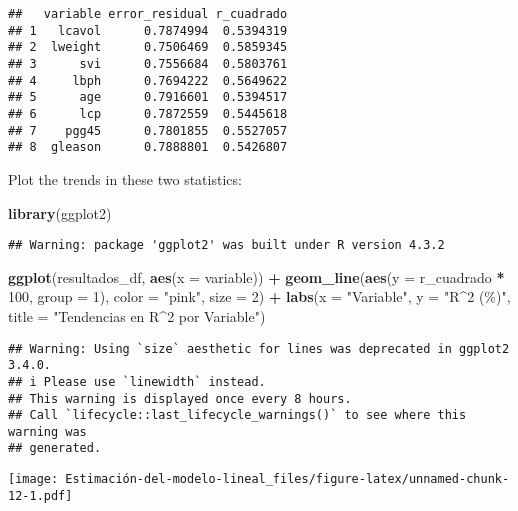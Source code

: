 \documentclass[
]{article}
\newenvironment{Shaded}{\begin{snugshade}}{\end{snugshade}}
\newcommand{\AttributeTok}[1]{\textcolor[rgb]{0.13,0.29,0.53}{#1}}
\newcommand{\DecValTok}[1]{\textcolor[rgb]{0.00,0.00,0.81}{#1}}
\newcommand{\FunctionTok}[1]{\textcolor[rgb]{0.13,0.29,0.53}{\textbf{#1}}}
\newcommand{\NormalTok}[1]{#1}
\newcommand{\SpecialCharTok}[1]{\textcolor[rgb]{0.81,0.36,0.00}{\textbf{#1}}}
\newcommand{\StringTok}[1]{\textcolor[rgb]{0.31,0.60,0.02}{#1}}
\begin{document}
\begin{verbatim}
##   variable error_residual r_cuadrado
## 1   lcavol      0.7874994  0.5394319
## 2  lweight      0.7506469  0.5859345
## 3      svi      0.7556684  0.5803761
## 4     lbph      0.7694222  0.5649622
## 5      age      0.7916601  0.5394517
## 6      lcp      0.7872559  0.5445618
## 7    pgg45      0.7801855  0.5527057
## 8  gleason      0.7888801  0.5426807
\end{verbatim}

Plot the trends in these two statistics:

\begin{Shaded}
\begin{Highlighting}[]
\FunctionTok{library}\NormalTok{(ggplot2)}
\end{Highlighting}
\end{Shaded}

\begin{verbatim}
## Warning: package 'ggplot2' was built under R version 4.3.2
\end{verbatim}

\begin{Shaded}
\begin{Highlighting}[]
\FunctionTok{ggplot}\NormalTok{(resultados\_df, }\FunctionTok{aes}\NormalTok{(}\AttributeTok{x =}\NormalTok{ variable)) }\SpecialCharTok{+}
  \FunctionTok{geom\_line}\NormalTok{(}\FunctionTok{aes}\NormalTok{(}\AttributeTok{y =}\NormalTok{ r\_cuadrado }\SpecialCharTok{*} \DecValTok{100}\NormalTok{, }\AttributeTok{group =} \DecValTok{1}\NormalTok{), }\AttributeTok{color =} \StringTok{"pink"}\NormalTok{, }\AttributeTok{size =} \DecValTok{2}\NormalTok{) }\SpecialCharTok{+}
  \FunctionTok{labs}\NormalTok{(}\AttributeTok{x =} \StringTok{"Variable"}\NormalTok{, }\AttributeTok{y =} \StringTok{"R\^{}2 (\%)"}\NormalTok{, }\AttributeTok{title =} \StringTok{"Tendencias en R\^{}2 por Variable"}\NormalTok{)}
\end{Highlighting}
\end{Shaded}

\begin{verbatim}
## Warning: Using `size` aesthetic for lines was deprecated in ggplot2 3.4.0.
## i Please use `linewidth` instead.
## This warning is displayed once every 8 hours.
## Call `lifecycle::last_lifecycle_warnings()` to see where this warning was
## generated.
\end{verbatim}

\texttt{[image: Estimación-del-modelo-lineal\_files/figure-latex/unnamed-chunk-12-1.pdf]}
\end{document}
